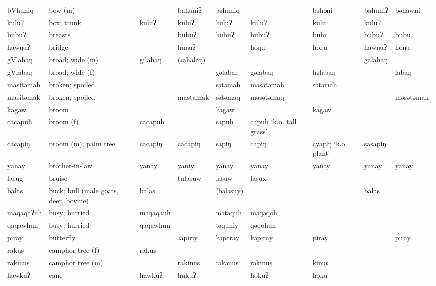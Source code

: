 \begin{landscape}
\begin{longtable}{*{9}{>{\raggedright\arraybackslash}p{}}}
\text{*}bVhuniq      & bow (m) &  & bahuniʔ & bəhuniq &  & bəhoni & bahuniʔ & bəhawni\\
\text{*}kuluʔ        & box; trunk & kuluʔ & kuluʔ & kuluʔ & kuluʔ & kulu & kuluʔ & \\
\text{*}bubuʔ        & breasts &  & bubuʔ & bubuʔ & bubuʔ & bubu & bubuʔ & bubu\\
\text{*}hawŋuʔ       & bridge &  & huŋuʔ &  & hoŋu & hoŋu & hawŋuʔ & hoŋu\\
\text{*}gVlahaŋ      & broad; wide (m) & gilahaŋ & (ɹahalaŋ) &  &  &  & galahaŋ & \\
\text{*}gVlabaŋ      & broad; wide (f) &  &  & gəlabaŋ & gəlabaŋ & həlabaŋ &  & labaŋ\\
\text{*}masitəmah    & broken; spoiled &  &  & sətəmah & məsətəmah & sətəmah &  & \\
\text{*}masitəmak    & broken; spoiled &  & mastamak & sətəmaq & məsətəmaq &  &  & məsətəmak\\
\text{*}kagaw        & broom &  &  & kagaw &  & kagaw &  & \\
\text{*}cacapuh      & broom (f) & cacapuh &  & sapuh & capuh `k.o. tall grass' &  &  & \\
\text{*}cacapiŋ      & broom (m); \newline palm tree & cacapiŋ & cacapiŋ & sapiŋ & capiŋ & cyapiŋ \newline `k.o. plant' & sasapiŋ & \\
\text{*}yanay        & brother-in-law & yanay & yaniy & yanay & yanay & yanay & yanay & yanay\\
\text{*}lasug        & bruise &  & tulasuw & lasuw & lasux &  &  & \\
\text{*}balas        & buck; bull (male goats, deer, bovine) & balas &  & (bələsuy) &  &  & balas & \\
\text{*}maqaqaʔuh    & busy; hurried & məqaqauh &  & mətəquh & məqəqoh &  &  & \\
\text{*}qaqawhun     & busy; hurried & qaqawhun &  & təquhiy & qəqohun &  &  & \\
\text{*}piray       & butterfly &  & ɹapiriy & kəperay & kəpiray & piray &  & piray\\
\text{*}rakus        & camphor tree (f) & rakus &  &  &  &  &  & \\
\text{*}rakinus      & camphor tree (m) &  & rakinus & rəkənus & rəkinus & kinus &  & \\
\text{*}hawkuʔ       & cane & hawkuʔ & hukuʔ &  & hokuʔ & hoku &  & \\

\end{longtable}
\end{landscape}
